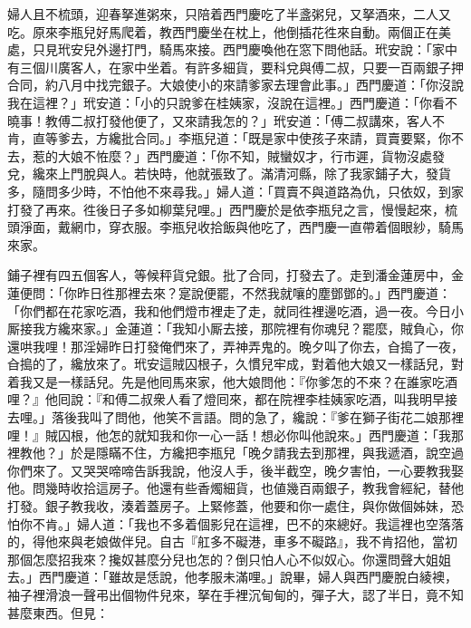 婦人且不梳頭，迎春拏進粥來，只陪着西門慶吃了半盞粥兒，又拏酒來，二人又吃。原來李瓶兒好馬爬着，教西門慶坐在枕上，他倒插花徃來自動。兩個正在美處，只見玳安兒外邊打門，騎馬來接。西門慶喚他在窓下問他話。玳安說：「家中有三個川廣客人，在家中坐着。有許多細貨，要科兌與傅二叔，只要一百兩銀子押合同，約八月中找完銀子。大娘使小的來請爹家去理會此事。」{}西門慶道：「你沒說我在這裡？」玳安道：「小的只說爹在桂姨家，沒說在這裡。」西門慶道：「你看不曉事！教傅二叔打發他便了，又來請我怎的？」玳安道：「傅二叔講來，客人不肯，直等爹去，方纔批合同。」李瓶兒道：「既是家中使孩子來請，買賣要緊，你不去，惹的大娘不恠麼？」西門慶道：「你不知，賊蠻奴才，行市遲，貨物沒處發兌，纔來上門脫與人。{}若快時，他就張致了。滿清河縣，除了我家鋪子大，發貨多，隨問多少時，不怕他不來尋我。」{}婦人道：「買賣不與道路為仇，{}只依奴，到家打發了再來。徃後日子多如柳葉兒哩。」西門慶於是依李瓶兒之言，慢慢起來，梳頭淨面，戴網巾，穿衣服。李瓶兒收拾飯與他吃了，西門慶一直帶着個眼紗，騎馬來家。

鋪子裡有四五個客人，等候秤貨兌銀。批了合同，打發去了。走到潘金蓮房中，金蓮便問：「你昨日徃那裡去來？寔說便罷，不然我就嚷的塵鄧鄧的。」西門慶道：「你們都在花家吃酒，我和他們燈市裡走了走，就同徃裡邊吃酒，過一夜。今日小厮接我方纔來家。」金蓮道：「我知小厮去接，那院裡有你魂兒？罷麼，賊負心，你還哄我哩！那淫婦昨日打發俺們來了，弄神弄鬼的。晚夕叫了你去，㒲搗了一夜，㒲搗的了，纔放來了。{}玳安這賊囚根子，久慣兒牢成，對着他大娘又一樣話兒，對着我又是一樣話兒。先是他囘馬來家，他大娘問他：『你爹怎的不來？在誰家吃酒哩？』他囘說：『和傅二叔衆人看了燈囘來，都在院裡李桂姨家吃酒，叫我明早接去哩。」落後我叫了問他，他笑不言語。問的急了，{}纔說：『爹在獅子街花二娘那裡哩！』賊囚根，他怎的就知我和你一心一話！想必你叫他說來。」西門慶道：「我那裡教他？」於是隱瞞不住，方纔把李瓶兒「晚夕請我去到那裡，與我遞酒，說空過你們來了。又哭哭啼啼告訴我說，他沒人手，後半截空，晚夕害怕，一心要教我娶他。問幾時收拾這房子。他還有些香燭細貨，也値幾百兩銀子，教我會經紀，替他打發。銀子教我收，湊着蓋房子。上緊修蓋，他要和你一處住，與你做個姊妹，恐怕你不肯。」{}婦人道：「我也不多着個影兒在這裡，巴不的來總好。我這裡也空落落的，得他來與老娘做伴兒。自古『舡多不礙港，車多不礙路』，我不肯招他，當初那個怎麼招我來？攙奴甚麼分兒也怎的？倒只怕人心不似奴心。{}{}你還問聲大姐姐去。」西門慶道：「雖故是恁說，他孝服未滿哩。」說畢，婦人與西門慶脫白綾襖，袖子裡滑浪一聲弔出個物件兒來，{}拏在手裡沉甸甸的，彈子大，認了半日，竟不知甚麼東西。但見：

